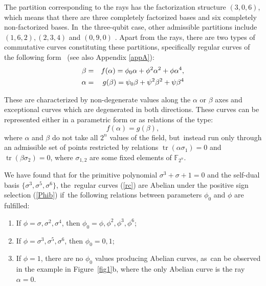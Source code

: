 \documentclass[quantumrep,article,accept,pdftex,moreauthors]{Definitions/mdpi}
\DeclareMathOperator{\tr}{tr}
\begin{document}
The partition corresponding to the rays has the factorization structure
$(3,0,6)$, which means that there are three completely factorized bases and six
completely non-factorized bases. In~the three-qubit case, other admissible
partitions include $(1,6,2),(2,3,4)$ and $(0,9,0)$ \cite{factor1,factor2}.
Apart from the rays, there are two types of commutative curves constituting
these partitions, specifically regular curves of the following form~\cite{GS2} (see also
Appendix \ref{appA}):
\begin{eqnarray}
  \beta
  &=& f(\alpha) = \phi_{0}\alpha +\phi^{2} \alpha^{2} + \phi \alpha^{4},
  \label{rc} \\
  \alpha
  &=& g(\beta) = \psi_{0}\beta +\psi^{2} \beta^{2} + \psi \beta^{4}
  \notag
\end{eqnarray}

These are characterized by non-degenerate values along the $\alpha$ or $\beta$ axes and
exceptional curves which are degenerated in both directions. These curves can be
represented either in a parametric form or as relations of the type:
\begin{equation*}
  f(\alpha) = g(\beta),
\end{equation*}
where $\alpha$ and $\beta$ do not take all $2^{n}$ values of the field, but~instead run only through an admissible set of points restricted by relations
$\tr(\alpha\sigma_{1}) = 0$ and $\tr(\beta\sigma_{2}) = 0$, where
$\sigma_{1,2}$ are some fixed elements of $\mathbb{F}_{2^{n}}$.

We have found that for the primitive polynomial $\sigma^{3} + \sigma + 1 = 0$
and the self-dual basis $\{\sigma^{3},\sigma^{5},\sigma^{6}\}$, the~regular
curves (\ref{rc}) are Abelian under the positive sign selection (\ref{Phib}) if~the following relations between parameters $\phi_{0}$ and $\phi$ are fulfilled:

\begin{enumerate}
  \item If $\phi =\sigma, \sigma^{2}, \sigma^{4}$, then $\phi_{0} =
    \phi,\phi^{2},\phi^{3}, \phi^{6}$;

  \item If $\phi = \sigma^{3}, \sigma^{5}, \sigma^{6}$, then $\phi_{0}=0,1$;

  \item If $\phi = 1$, there are no $\phi_{0}$ values producing Abelian curves, as~can
    be observed in the example in Figure~\ref{fig1}b, where the only Abelian
    curve is the ray $\alpha = 0$.
\end{enumerate}
\end{document}
